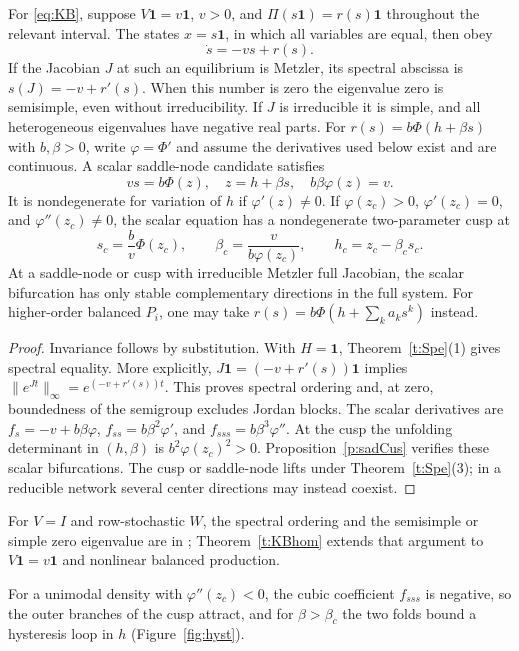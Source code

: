 For \eqref{eq:KB}, suppose
$V\mathbf1=v\mathbf1$, $v>0$, and
$\Pi(s\mathbf1)=r(s)\mathbf1$ throughout the relevant interval.
The states $x=s\mathbf1$, in which all variables are equal, then obey
\begin{equation}\label{eq:KBscalar}
 \dot s=-vs+r(s).
\end{equation}
If the Jacobian $J$ at such an equilibrium is Metzler, its spectral
abscissa is $s(J)=-v+r'(s)$.
When this number is zero the eigenvalue zero is semisimple, even
without irreducibility. If $J$ is irreducible it is simple, and all
heterogeneous eigenvalues have negative real parts.
For $r(s)=b\Phi(h+\beta s)$ with $b,\beta>0$,
write $\varphi=\Phi'$ and assume the derivatives used below exist and
are continuous. A scalar saddle-node candidate
satisfies
\[
 vs=b\Phi(z),\quad z=h+\beta s,\quad b\beta\varphi(z)=v.
\]
It is nondegenerate for variation of $h$ if $\varphi'(z)\ne0$.
If $\varphi(z_c)>0$, $\varphi'(z_c)=0$, and
$\varphi''(z_c)\ne0$, the scalar equation has a nondegenerate two-parameter cusp at
\[
 s_c=\frac b v\Phi(z_c),\qquad
 \beta_c=\frac v{b\varphi(z_c)},\qquad
 h_c=z_c-\beta_cs_c.
\]
At a saddle-node or cusp with irreducible Metzler full Jacobian, the scalar
bifurcation has only stable complementary directions in the full system.
For higher-order balanced $P_i$, one may take
$r(s)=b\Phi(h+\sum_k a_ks^k)$ instead.
\eeT
\begin{proof}
Invariance follows by substitution. With $H=\mathbf1$,
Theorem~\ref{t:Spe}(1) gives spectral equality. More explicitly,
$J\mathbf1=(-v+r'(s))\mathbf1$ implies
$\|e^{Jt}\|_\infty=e^{(-v+r'(s))t}$. This proves spectral ordering
and, at zero, boundedness of the semigroup excludes Jordan blocks.
The scalar derivatives are
$f_s=-v+b\beta\varphi$, $f_{ss}=b\beta^2\varphi'$, and
$f_{sss}=b\beta^3\varphi''$. At the cusp the unfolding determinant
in $(h,\beta)$ is $b^2\varphi(z_c)^2>0$.
Proposition~\ref{p:sadCus} verifies these scalar bifurcations.
The cusp or saddle-node lifts under Theorem~\ref{t:Spe}(3); in a
reducible network several center directions may instead coexist.
\end{proof}

For $V=I$ and row-stochastic $W$, the spectral ordering and the semisimple or simple zero
eigenvalue are in \cite{Boud26}; Theorem~\ref{t:KBhom} extends that argument to
$V\mathbf1=v\mathbf1$ and nonlinear balanced production.

For a unimodal density with $\varphi''(z_c)<0$, the cubic coefficient $f_{sss}$ is negative, so the outer branches of the cusp
attract, and for $\beta>\beta_c$ the two folds bound a hysteresis loop in $h$ (Figure~\ref{fig:hyst}).


